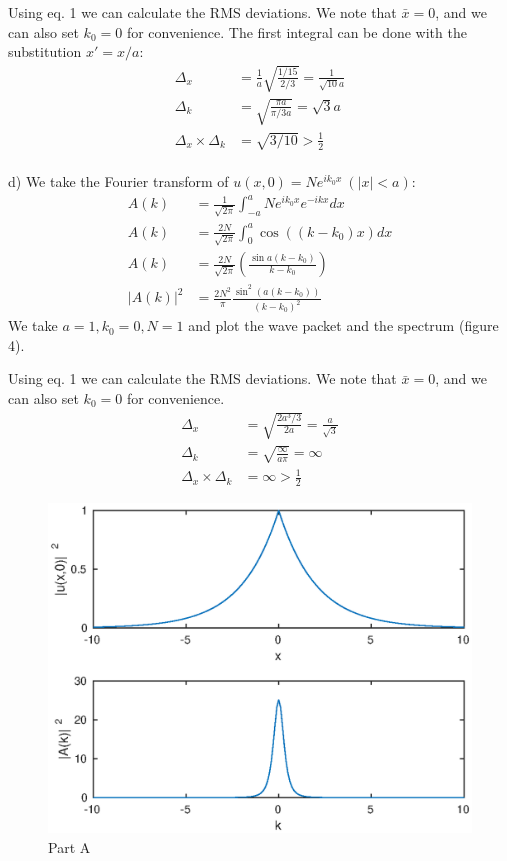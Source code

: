 \documentclass[a4paper,11pt]{article}
\numberwithin{equation}{section}
\newcommand{\lrp}[1]{\left({#1}\right)}
\begin{document}
Using eq. 1 we can calculate the RMS deviations.
We note that $\bar{x}=0$, and we can also set $k_0=0$ for convenience.
The first integral can be done with the substitution $x' = x/a$:
\begin{align}
 \Delta_x &= \frac{1}{a} \sqrt{\frac{1/15}{2/3}}= \frac{1}{\sqrt{10}a}\\
 \Delta_k &= \sqrt{\frac{\pi a}{\pi/3a}} = \sqrt{3}a\\
 \Delta_x \times \Delta_k &= \sqrt{3/10} > \frac{1}{2}
\end{align}
\\
d) We take the Fourier transform of $u(x,0) = Ne^{ik_0x}\ (|x|<a)$:
\begin{align}
 A(k) &= \frac{1}{\sqrt{2\pi}}\int_{-a}^{a} Ne^{ik_0x}e^{-ikx}dx\\
 A(k) &= \frac{2N}{\sqrt{2\pi}}\int_{0}^{a} \cos{((k-k_0)x)} dx\\
 A(k) &= \frac{2N}{\sqrt{2\pi}}\lrp{\frac{\sin{a(k-k_0)}}{k-k_0}}\\
 |A(k)|^2 &= \frac{2N^2}{\pi}\frac{\sin^2{(a(k-k_0))}}{(k-k_0)^2}
\end{align}
We take $a=1, k_0=0, N=1$ and plot the wave packet and the spectrum (figure 4).

Using eq. 1 we can calculate the RMS deviations.
We note that $\bar{x}=0$, and we can also set $k_0=0$ for convenience.
\begin{align}
 \Delta_x &= \sqrt{\frac{2a^3/3}{2a}}= \frac{a}{\sqrt{3}}\\
 \Delta_k &= \sqrt{\frac{\infty}{a\pi}} = \infty\\
 \Delta_x \times \Delta_k &= \infty > \frac{1}{2}
\end{align}

\begin{figure}[p]
 \caption{Part A}
 \centering
   \includegraphics[width=\textwidth]{a}
\end{figure}
\end{document}
